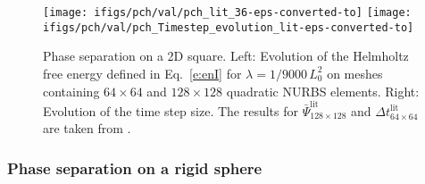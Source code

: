 \documentclass[11pt]{article}
\begin{document}
\begin{figure}
\centering
\texttt{[image: ifigs/pch/val/pch\_lit\_36-eps-converted-to]}
\texttt{[image: ifigs/pch/val/pch\_Timestep\_evolution\_lit-eps-converted-to]}
\caption{Phase separation on a 2D square. Left: Evolution of the Helmholtz free energy defined in Eq.~\eqref{e:enI} for $\lambda=1/9000\,L_0^2$ on meshes containing $64\times 64$ and $128\times 128$ quadratic NURBS elements. 
Right: Evolution of the time step size. 
The results for $\bar\Psi_{128\times 128}^\mathrm{lit}$ and $\Delta t_{64\times 64}^\mathrm{lit}$ are taken from \citet{gomez08-1}.}
\label{fig:ss_dt}
\end{figure}

\subsubsection{Phase separation on a rigid sphere}
\end{document}
